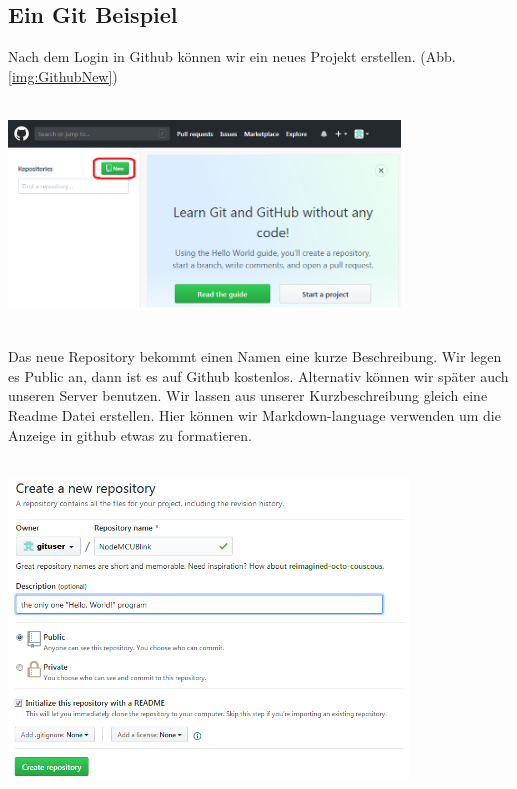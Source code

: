 \subsection{Ein Git Beispiel}
Nach dem Login in Github können wir ein neues Projekt erstellen. (Abb. \ref{img:GithubNew})\\
\ \\
\begin{minipage}[t]{\textwidth}
  \centering
  \includegraphics[height=5cm]{pictures/GithubNew.png}
  \label{img:GithubNew}
  \end{minipage}
\ \\
Das neue Repository bekommt einen Namen eine kurze Beschreibung. Wir legen es Public an, dann ist es auf Github kostenlos. Alternativ können wir später auch unseren Server benutzen. Wir lassen aus unserer Kurzbeschreibung gleich eine Readme Datei erstellen. Hier können wir Markdown-language verwenden um die Anzeige in github etwas zu formatieren.\\
\ \\
\begin{minipage}[t]{\textwidth}
  \centering
  \includegraphics[height=8cm]{pictures/GithubCreate.png}
  \label{img:GithubCreate}
\end{minipage}
